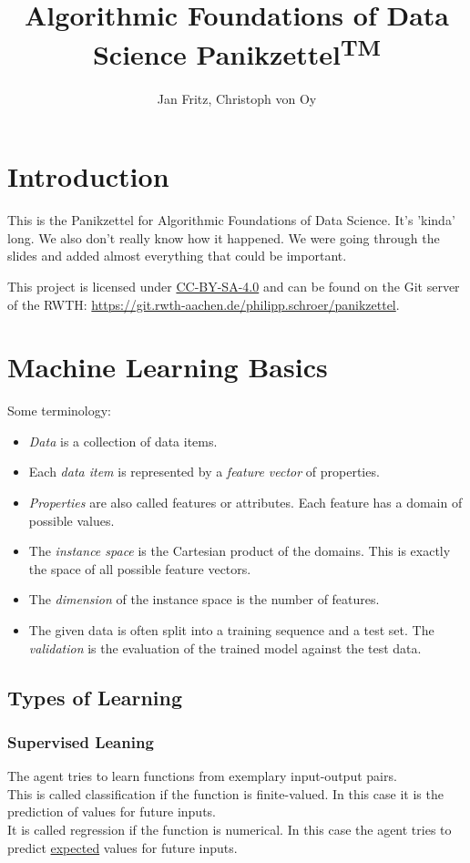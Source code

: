 \documentclass[english]{panikzettel}
\title{Algorithmic Foundations of Data Science Panikzettel\textsuperscript{\footnotesize TM}}
\author{Jan Fritz, Christoph von Oy}
\begin{document}
\maketitle

\tableofcontents

\section{Introduction}
This is the Panikzettel for Algorithmic Foundations of Data Science. It's 'kinda' long. We also don't really know how it happened. We were going through the slides and added almost everything that could be important.

This project is licensed under \href{https://creativecommons.org/licenses/by-sa/4.0/}{CC-BY-SA-4.0} and can be found on the Git server of the RWTH: \url{https://git.rwth-aachen.de/philipp.schroer/panikzettel}.

\newpage

\section{Machine Learning Basics}
Some terminology:
\begin{itemize}
\item \emph{Data} is a collection of data items.
\item Each \emph{data item} is represented by a \emph{feature vector} of properties.
\item \emph{Properties} are also called features or attributes. Each feature has a domain of possible values.
\item The \emph{instance space} is the Cartesian product of the domains. This is exactly the space of all possible feature vectors.
\item The \emph{dimension} of the instance space is the number of features.
\item The given data is often split into a training sequence and a test set. The \emph{validation} is the evaluation of the trained model against the test data.
\end{itemize}

\subsection{Types of Learning}
\subsubsection{Supervised Leaning}
The agent tries to learn functions from exemplary input-output pairs.\\
This is called classification if the function is finite-valued. In this case it is the prediction of values for future inputs.\\
It is called regression if the function is numerical. In this case the agent tries to predict \underline{expected} values for future inputs.
\end{document}
